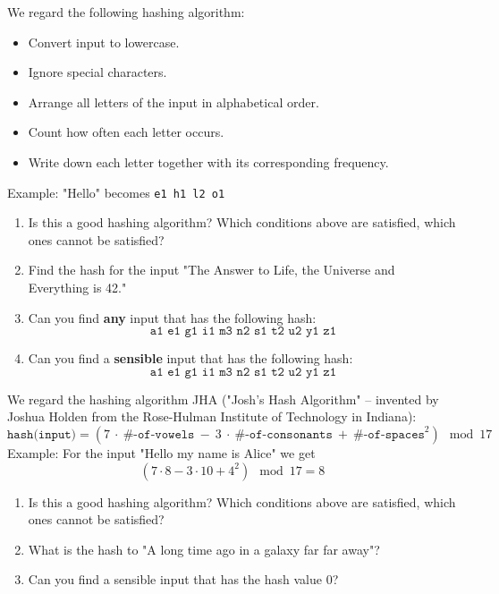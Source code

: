 \documentclass[11pt,a4paper]{report}
\begin{document}
\begin{ex}
We regard the following hashing algorithm: 
\begin{itemize}
\item Convert input to lowercase.
\item Ignore special characters.
\item Arrange all letters of the input in alphabetical order.
\item Count how often each letter occurs.
\item Write down  each letter together with its corresponding frequency.
\end{itemize}
Example: "Hello" becomes \texttt{e1 h1 l2 o1}
\begin{enumerate}
\item Is this a good hashing algorithm? Which conditions above are satisfied, which ones cannot be satisfied?
\item Find the hash for the input "The Answer to Life, the Universe and Everything is 42."
\item Can you find {\bf any} input that has the following hash:
\[
\texttt{a1 e1 g1 i1 m3 n2 s1 t2 u2 y1 z1}
\]
\item Can you find a {\bf sensible} input that has the following hash:
\[
\texttt{a1 e1 g1 i1 m3 n2 s1 t2 u2 y1 z1}
\]
\end{enumerate}
\end{ex}

\begin{ex}
We regard the hashing algorithm JHA ("Josh's Hash Algorithm" -- invented by Joshua Holden from the Rose-Hulman Institute of Technology in Indiana): 
\[
\texttt{hash(input)} = (7\ \cdot\ \texttt{\#-of-vowels}\  -\  3\ \cdot \ \texttt{\#-of-consonants}\  +\  \texttt{\#-of-spaces}^2) \mod 17
\]
Example: For the input "Hello my name is Alice" we get
\[
(7\cdot 8 - 3\cdot 10 + 4^2) \mod 17 = 8
\] 
\begin{enumerate}
\item Is this a good hashing algorithm? Which conditions above are satisfied, which ones cannot be satisfied?
\item What is the hash to "A long time ago in a galaxy far far away"?
\item Can you find a sensible input that has the hash value $0$?
\end{enumerate}
\end{ex}


\newpage
\end{document}

